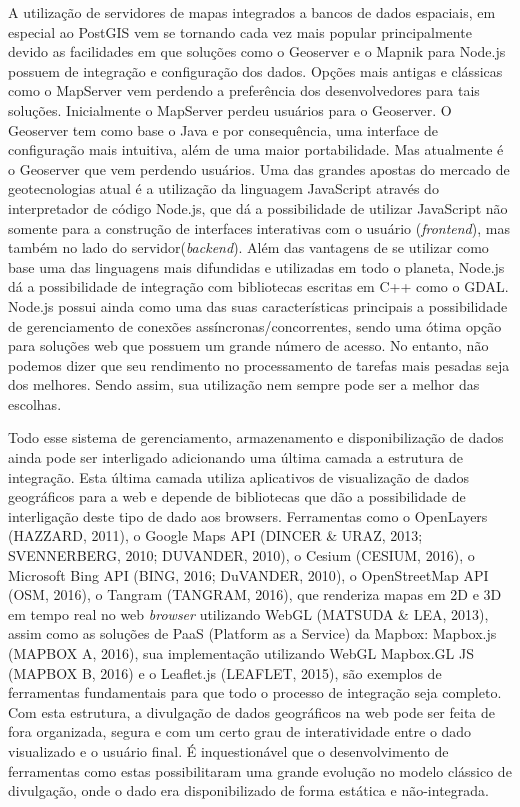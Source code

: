 		A utilização de servidores de mapas integrados a bancos de dados espaciais, em especial ao PostGIS vem se tornando cada vez mais popular principalmente devido as facilidades em que soluções como o Geoserver e o Mapnik para Node.js possuem de integração e configuração dos dados. Opções mais antigas e clássicas como o MapServer vem perdendo a preferência dos desenvolvedores para tais soluções. Inicialmente o MapServer perdeu usuários para o Geoserver. O Geoserver tem como base o Java e por consequência, uma interface de configuração mais intuitiva, além de uma maior portabilidade. Mas atualmente é o Geoserver que vem perdendo usuários. Uma das grandes apostas do mercado de geotecnologias atual é a utilização da linguagem JavaScript através do interpretador de código Node.js, que dá a possibilidade de utilizar JavaScript não somente para a construção de interfaces interativas com o usuário (\textit{frontend}), mas também no lado do servidor(\textit{backend}). Além das vantagens de se utilizar como base uma das linguagens mais difundidas e utilizadas em todo o planeta, Node.js dá a possibilidade de integração com bibliotecas escritas em C++ como o GDAL. Node.js possui ainda como uma das suas características principais a possibilidade de gerenciamento de conexões assíncronas/concorrentes, sendo uma ótima opção para soluções web que possuem um grande número de acesso. No entanto, não podemos dizer que seu rendimento no processamento de tarefas mais pesadas seja dos melhores. Sendo assim, sua utilização nem sempre pode ser a melhor das escolhas.
		
		Todo esse sistema de gerenciamento, armazenamento e disponibilização de dados ainda pode ser interligado adicionando uma última camada a estrutura de integração. Esta última camada utiliza aplicativos de visualização de dados geográficos para a web e depende de bibliotecas que dão a possibilidade de interligação deste tipo de dado aos browsers. Ferramentas como o OpenLayers (HAZZARD, 2011)\cite{HAZZARD}, o Google Maps API (DINCER \& URAZ, 2013\cite{DINCER_URAZ}; SVENNERBERG, 2010\cite{SVENNERBERG}; DUVANDER, 2010\cite{DUVANDER}), o Cesium (CESIUM, 2016)\cite{CESIUM}, o Microsoft Bing API (BING, 2016; DuVANDER, 2010\cite{DUVANDER}), o OpenStreetMap API (OSM, 2016)\cite{OSM}, o Tangram (TANGRAM, 2016)\cite{TANGRAM}, que renderiza mapas em 2D e 3D em tempo real no web \textit{browser} utilizando WebGL (MATSUDA \& LEA, 2013)\cite{MATSUDA_LEA},  assim como as soluções de PaaS (Platform as a Service) da Mapbox: Mapbox.js (MAPBOX A, 2016), sua implementação utilizando WebGL Mapbox.GL JS (MAPBOX B, 2016)\cite{MAPBOX_GLJS} e o Leaflet.js (LEAFLET, 2015)\cite{LEAFLET}, são exemplos de ferramentas fundamentais para que todo o processo de integração seja completo. Com esta estrutura, a divulgação de dados geográficos na web pode ser feita de fora organizada, segura e com um certo grau de interatividade entre o dado visualizado e o usuário final. É inquestionável que o desenvolvimento de ferramentas como estas possibilitaram uma grande evolução no modelo clássico de divulgação, onde o dado era disponibilizado de forma estática e não-integrada.
		
